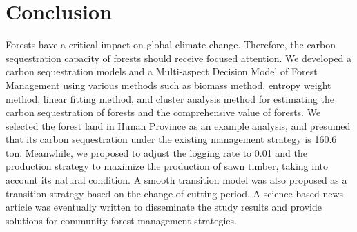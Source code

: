 
\section{Conclusion}

Forests have a critical impact on global climate change. Therefore, the carbon sequestration capacity of forests should receive focused attention. We developed a carbon sequestration models and a Multi-aspect Decision Model of Forest Management using various methods such as biomass method, entropy weight method, linear fitting method, and cluster analysis method for estimating the carbon sequestration of forests and the comprehensive value of forests. We selected the forest land in Hunan Province as an example analysis, and presumed that its carbon sequestration under the existing management strategy is 160.6 ton. Meanwhile, we proposed to adjust the logging rate to 0.01 and the production strategy to maximize the production of sawn timber, taking into account its natural condition. A smooth transition model was also proposed as a transition strategy based on the change of cutting period. A science-based news article was eventually written to disseminate the study results and provide solutions for community forest management strategies.